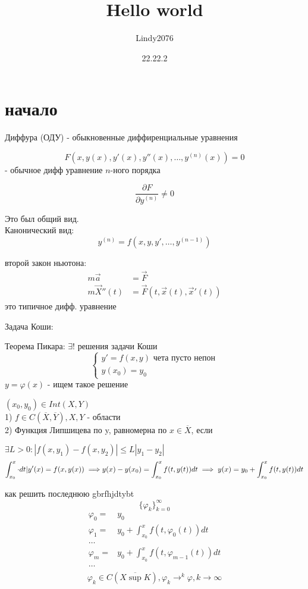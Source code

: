 \documentclass[12pt, a4paper]{article}
\title{Hello world}
\author{Lindy2076}
\date{22.22.2} %
\begin{document}
\section{начало}

	Диффура (ОДУ) - обыкновенные диффиренциальные уравнения
	
	$$F(x, y(x), y'(x), y''(x), \dotsc, y^{(n)}(x)) = 0$$ - обычное дифф уравнение $n$-ного порядка
	
	$$\frac{\partial F}{\partial y^{(n)}} \neq 0$$

Это был общий вид.\\
Канонический вид:
$$y^{(n)} = f(x,y,y',\dotsc,y^{(n-1)})$$

второй закон ньютона: 
\begin{align}
m\vec{a} &= \vec{F} \\
m\vec{X}''(t) &= \vec{F}(t, \vec{x}(t), \vec{x}'(t))
\end{align}
это типичное дифф. уравнение

Задача Коши:



Теорема Пикара: $\exists!$ решения задачи Коши
$$\begin{cases}
	y' = f(x,y) \text{ чета пусто непон}\\
	y(x_0) = y_0
\end{cases}$$
$ y = \varphi(x)$ - ищем такое решение 

$(x_0, y_0) \in Int(X, Y)$\\
1) $f \in C(\overline{X}, \overline{Y}), X, Y$ - области \\
2) Функция Липшицева по y, равномерна по $x \in \overline{X}$, если

$\exists L>0: | f(x,y_1) - f(x,y_2)| \le L |y_1-y_2|$\\

$$\int^{x}_{x_0} \cdot dt | y'(x) = f(x, y(x)) \implies \\ y(x)-y(x_0) = \int^x_{x_0} f(t, y(t))dt \implies y(x) = y_0 + \int^x_{x_0}f(t,y(t))dt$$

как решить последнюю 
gbrfhjdtybt
$$\{\varphi_k\}^\infty_{k=0}$$
$$
\begin{matrix}
\varphi_0 =& y_0 \\
\varphi_1 =& y_0 + \int^x_{x_0}f(t, \varphi_0(t))dt \\
\dotsc \\
\varphi_m =& y_0 + \int^x_{x_0}f(t, \varphi_{m-1}(t))dt \\
\dotsc \\
\end{matrix}$$
$$ \varphi_k \in C(\overline{X \sup K}), \varphi_k \rightarrow^k \varphi, k\to\infty
$$
\end{document}
